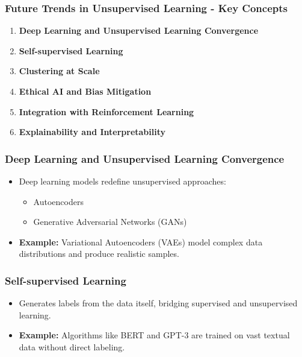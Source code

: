 \documentclass[aspectratio=169]{beamer}
\begin{document}
\begin{frame}[fragile]
    \frametitle{Future Trends in Unsupervised Learning - Key Concepts}
    \begin{enumerate}
        \item \textbf{Deep Learning and Unsupervised Learning Convergence}
        \item \textbf{Self-supervised Learning}
        \item \textbf{Clustering at Scale}
        \item \textbf{Ethical AI and Bias Mitigation}
        \item \textbf{Integration with Reinforcement Learning}
        \item \textbf{Explainability and Interpretability}
    \end{enumerate}
\end{frame}

\begin{frame}[fragile]
    \frametitle{Deep Learning and Unsupervised Learning Convergence}
    \begin{itemize}
        \item Deep learning models redefine unsupervised approaches:
        \begin{itemize}
            \item Autoencoders
            \item Generative Adversarial Networks (GANs)
        \end{itemize}
        \item \textbf{Example:} Variational Autoencoders (VAEs) model complex data distributions and produce realistic samples.
    \end{itemize}
\end{frame}

\begin{frame}[fragile]
    \frametitle{Self-supervised Learning}
    \begin{itemize}
        \item Generates labels from the data itself, bridging supervised and unsupervised learning.
        \item \textbf{Example:} Algorithms like BERT and GPT-3 are trained on vast textual data without direct labeling.
    \end{itemize}
\end{frame}
\end{document}
